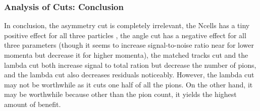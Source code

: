 \documentclass{beamer}
\begin{document}
\frame
{
\frametitle{Analysis of Cuts: Conclusion}
In conclusion, the asymmetry cut  is completely irrelevant, the Ncells has a tiny positive effect for all three particles , the angle cut has a negative effect for all three parameters (though it seems to increase signal-to-noise ratio near for lower momenta but decrease it for higher momenta), the matched tracks cut  and the lambda cut both increase signal to total ration but decrease the number of pions, and the lambda cut also decreases residuals noticeably. However, the lambda cut may not be worthwhile as it cuts one half of all the pions. On the other hand, it may be worthwhile because other than the pion count, it yields the highest amount of benefit.
}
\end{document}
